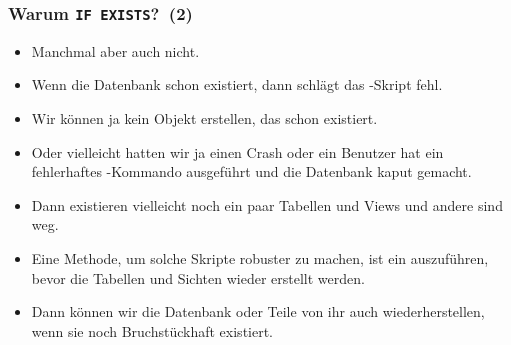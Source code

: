 \documentclass[aspectratio=169,mathserif,notheorems]{beamer}%
\begin{document}
%
\begin{frame}%
\frametitle{Warum \texttt{IF EXISTS}?~(2)}%
\begin{itemize}%
\item Manchmal aber auch nicht.%
%
\item<2-> Wenn die Datenbank schon existiert, dann schlägt das -Skript fehl.%
%
\item<3-> Wir können ja kein Objekt erstellen, das schon existiert.%
%
\item<4-> Oder vielleicht hatten wir ja einen Crash oder ein Benutzer hat ein fehlerhaftes -Kommando ausgeführt und die Datenbank kaput gemacht.%
%
\item<5-> Dann existieren vielleicht noch ein paar Tabellen und Views und andere sind weg.%
%
\item<6-> Eine Methode, um solche Skripte robuster zu machen, ist ein  auszuführen, bevor die Tabellen und Sichten wieder erstellt werden.%
%
\item<7-> Dann können wir die Datenbank oder Teile von ihr auch wiederherstellen, wenn sie noch Bruchstückhaft existiert.%
\end{itemize}%
\end{frame}%
%
\end{document}
